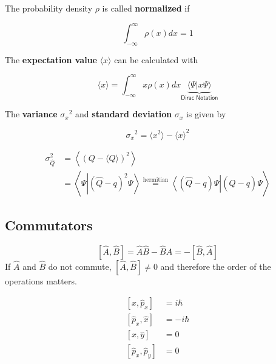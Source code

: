 The probability density $\rho$ is called \textbf{normalized} if

\begin{equation*}
    \int_{-\infty}^{\infty}\rho(x)dx = 1
\end{equation*}

The \textbf{expectation value} $\langle x \rangle$ can be calculated with

\begin{equation*}
    \langle x \rangle = \int_{-\infty}^{\infty} x\rho(x) dx \underbrace{{\langle \Psi|x\Psi\rangle} }_{\textsf{Dirac Notation}}
\end{equation*}

The \textbf{variance} ${\sigma_x}^2$ and \textbf{standard deviation} $\sigma_x$ is given by

\begin{equation*}
    {\sigma_x}^2 = \langle x^2 \rangle - {\langle x \rangle }^2
\end{equation*}

\begin{align*}
    \sigma_{\widehat{Q}}^{2} & =\left\langle{\left(Q-\langle Q\rangle\right)}^{2}\right\rangle                                                                                                                                    \\
                             & =\left\langle\Psi\left|{\left(\widehat{Q}-q\right)}^{2}\Psi\right\rangle\stackrel{\text{hermitian}}{=}\left\langle\left(\widehat{Q}-q\right)\Psi\right|\left(\widehat{Q}-q\right)\Psi\right\rangle
\end{align*}

\subsection{Commutators}\label{comm}

\noindent\begin{equation*}
    \left[\widehat{A},\widehat{B}\right] = \widehat{A}\widehat{B} - \widehat{B}\widehat{A} = -\left[\widehat{B},\widehat{A}\right]
\end{equation*}
If $\widehat{A}$ and $\widehat{B}$ do not commute, $\left[\widehat{A},\widehat{B}\right] \neq 0$ and therefore the order of the operations matters.

\newpar{}


\begin{align*}
    \left[\widehat{x},\widehat{p}_x\right]    & = i\hbar  \\
    \left[\widehat{p}_x, \widehat{x}\right]   & = -i\hbar \\
    \left[\widehat{x}, \widehat{y}\right]     & = 0       \\
    \left[\widehat{p}_x, \widehat{p}_y\right] & = 0
\end{align*}

